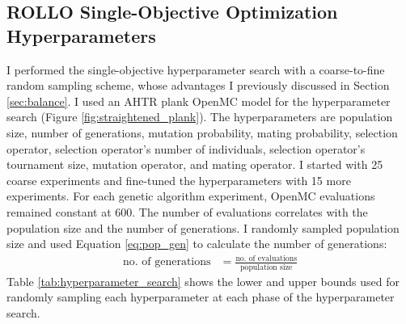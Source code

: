 \subsection{ROLLO Single-Objective Optimization Hyperparameters}
\label{sec:rollo-single-hyp}
I performed the single-objective hyperparameter search with a coarse-to-fine random 
sampling scheme, whose advantages I previously discussed in Section \ref{sec:balance}.
I used an \gls{AHTR} plank OpenMC model for the hyperparameter search (Figure 
\ref{fig:straightened_plank}). 
The hyperparameters are population size, number of generations, 
mutation probability, mating probability, selection operator, selection operator's 
number of individuals, selection operator's tournament size, mutation operator, 
and mating operator.  
I started with 25 coarse experiments and fine-tuned the hyperparameters
with 15 more experiments. 
For each genetic algorithm experiment, OpenMC evaluations remained constant at 600.
The number of evaluations correlates with the population size and the number of 
generations. 
I randomly sampled population size and used Equation \ref{eq:pop_gen} to calculate 
the number of generations: 
\begin{align}
    \label{eq:pop_gen}
    \mbox{no. of generations} &= \frac{\mbox{no. of evaluations}}{\mbox{population size} }
\end{align}
Table \ref{tab:hyperparameter_search} shows the lower and upper bounds used 
for randomly sampling each hyperparameter at each phase of the hyperparameter search.
